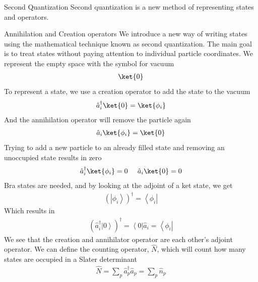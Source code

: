 \documentclass[twoside,english]{uiofysmaster}
\begin{document}
\begin{chapter}{Second Quantization}
 	Second quantization is a new method of representing states and operators. 
	\begin{section}{Annihilation and Creation operators}
		We introduce a new way of writing states using the mathematical technique known as second quantization. The main goal is to treat states without paying attention
		to individual particle coordinates. We represent the empty space with the symbol for vacuum
		\begin{align}
			\ket{0}
		\end{align}
		To represent a state, we use a creation operator to add the state to the vacuum
		\begin{align}
			\hat a_i^{\dagger} \ket{0} = \ket{\phi_i}
		\end{align}
		And the annihilation operator will remove the particle again
		\begin{align}
			\hat a_i \ket{\phi_i} = \ket{0}
		\end{align}
		Trying to add a new particle to an already filled state and removing an unoccupied state results in zero
		\begin{align}
			\hat a_i^{\dagger} \ket{\phi_i} = 0 \;\;\;\;\; \hat a_i \ket{0} = 0
		\end{align}
		Bra states are needed, and by looking at the adjoint of a ket state, we get
		\begin{align}
			\left(\left| \phi_i \right> \right)^\dagger = \left< \phi_i \right| 
		\end{align}
		Which results in
		\begin{align}
			\left( \hat a_i^\dagger \left| 0 \right> \right)^\dagger = \left< 0 \right| \hat a_i = \left< \phi_i \right|
		\end{align}
		We see that the creation and annihilator operator are each other's adjoint operator. We can define the counting operator, $\hat N$, which will count how many states are occupied in a Slater determinant
		\begin{align}
			\hat N = \sum_p \hat a^\dagger_p \hat a_p = \sum_p \hat n_p
		\end{align}
	\end{section}


\end{chapter}
\end{document}
